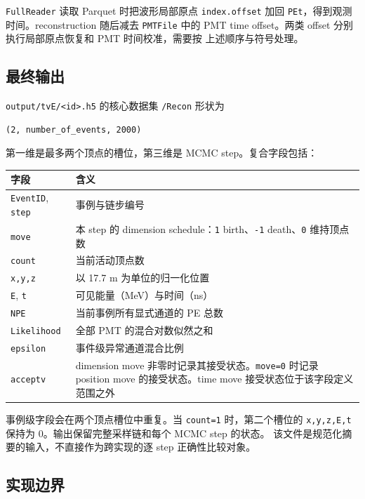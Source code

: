\documentclass[UTF8,a4paper,11pt]{ctexart}
\begin{document}
\texttt{FullReader} 读取 Parquet 时把波形局部原点 \texttt{index.offset} 加回
\texttt{PEt}，得到观测时间。reconstruction 随后减去 \texttt{PMTFile} 中的
PMT time offset。两类 offset 分别执行局部原点恢复和 PMT 时间校准，需要按
上述顺序与符号处理。

\subsection{最终输出}

\texttt{output/tvE/\textless{}id\textgreater{}.h5} 的核心数据集 \texttt{/Recon} 形状为

\begin{verbatim}
(2, number_of_events, 2000)
\end{verbatim}

第一维是最多两个顶点的槽位，第三维是 MCMC step。复合字段包括：

\begin{longtable}[]{@{}L{0.18\textwidth}L{0.75\textwidth}@{}}
\toprule\noalign{}
字段 & 含义 \\
\midrule\noalign{}
\endhead
\bottomrule\noalign{}
\endlastfoot
\texttt{EventID}, \texttt{step} & 事例与链步编号 \\
\texttt{move} & 本 step 的 dimension schedule：\texttt{1} birth、\texttt{-1} death、\texttt{0} 维持顶点数 \\
\texttt{count} & 当前活动顶点数 \\
\texttt{x,y,z} & 以 17.7 m 为单位的归一化位置 \\
\texttt{E}, \texttt{t} & 可见能量（MeV）与时间（ns） \\
\texttt{NPE} & 当前事例所有显式通道的 PE 总数 \\
\texttt{Likelihood} & 全部 PMT 的混合对数似然之和 \\
\texttt{epsilon} & 事件级异常通道混合比例 \\
\texttt{acceptv} & dimension move 非零时记录其接受状态。\texttt{move=0} 时记录 position move 的接受状态。time move 接受状态位于该字段定义范围之外 \\
\end{longtable}

事例级字段会在两个顶点槽位中重复。当 \texttt{count=1} 时，第二个槽位的
\texttt{x,y,z,E,t} 保持为 0。输出保留完整采样链和每个 MCMC step 的状态。
该文件是规范化摘要的输入，不直接作为跨实现的逐 step 正确性比较对象。

\subsection{实现边界}
\end{document}
